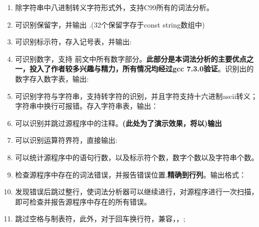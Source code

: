 \documentclass{article}
\begin{document}
\begin{enumerate}[noitemsep,topsep=\mdcompacttopsep]%

\item{}除字符串中八进制转义字符形式外，支持C99所有的词法分析。%

\item{}可识别保留字，并输出 .(32个保留字存于const string数组中)%

\item{}可识别标示符，存入记号表，并输出: %

\item{}可识别数字，支持 前文中所有数字部分。\textbf{此部分是本词法分析的主要优点之一，投入了作者较多兴趣与精力，所有情况均经过gcc 7.3.0验证}。识别出的数字存入数字表，输出: %

\item{}可识别字符与字符串，支持转字符的识别，并且字符支持十六进制ascii转义；字符串中换行可报错。存入字符串表，输出：%

\item{}可以识别并跳过源程序中的注释。\textbf{(此处为了演示效果，将以)输出}%

\item{}可以识别运算符界符，直接输出: %

\item{}可以统计源程序中的语句行数，以及标示符个数，数字个数以及字符串个数。%

\item{}检查源程序中存在的词法错误，并报告错误位置,\textbf{精确到行列}。输出格式：%

\item{}发现错误后跳过整行，使词法分析器可以继续进行，对源程序进行一次扫描，即可检查并报告源程序中存在的所有错误。%

\item{}跳过空格与制表符，此外，对于回车换行符，兼容，，;%
\end{enumerate}%
\end{document}
